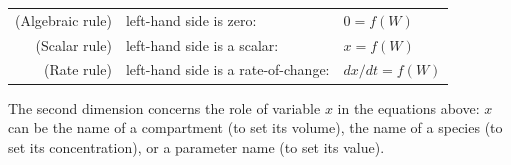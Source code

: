 \documentclass[10pt]{cekarticle}
\newcommand{\changed}[1]{\textcolor{BrickRed}{#1}}
\newenvironment{blockChanged}{\color{BrickRed}}{}
\begin{document}
\begin{blockChanged}
\begin{center}
\begin{tabular}{rll}
(Algebraic rule) & left-hand side is zero:             & $0 = f(W)$\\
(Scalar rule) 	& left-hand side is a scalar:         & $x = f(W)$\\
(Rate rule) 	& left-hand side is a rate-of-change: & $dx/dt = f(W)$
\end{tabular}
\end{center}
\end{blockChanged}

The second dimension concerns the role of variable $x$ in the equations
above: $x$ can be the name of a compartment (to set its volume), the name
of a \changed{species} (to set its concentration), or a parameter name (to
set its value).  
\end{document}
